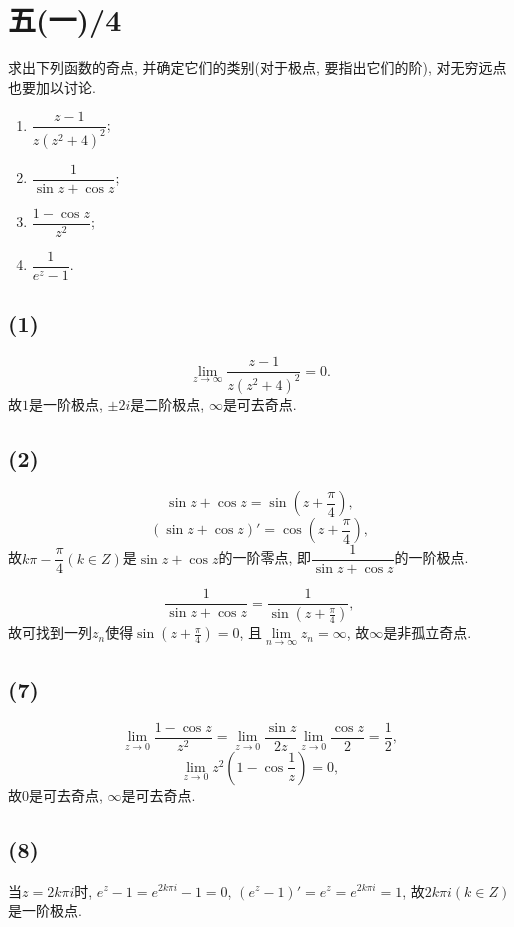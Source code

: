\documentclass[11pt,a4paper]{article}
\author{刘逸灏 (515370910207)}
\begin{document}
\maketitle

\section{五(一)/4}
\begin{problem}
求出下列函数的奇点, 并确定它们的类别(对于极点, 要指出它们的阶), 对无穷远点也要加以讨论.
\begin{enumerate}
  \item $\dfrac{z-1}{z(z^2+4)^2}$;
  \item $\dfrac{1}{\sin z+\cos z}$;
        \addtocounter{enumi}{4}
  \item $\dfrac{1-\cos z}{z^2}$;
  \item $\dfrac{1}{e^z-1}$.
\end{enumerate}
\end{problem}
\subsection*{(1)}
$$\lim_{z\to\infty}\frac{z-1}{z(z^2+4)^2}=0.$$
故$1$是一阶极点, $\pm2i$是二阶极点, $\infty$是可去奇点.

\subsection*{(2)}
$$\sin z+\cos z=\sin\left(z+\frac{\pi}{4}\right),$$
$$(\sin z+\cos z)'=\cos\left(z+\frac{\pi}{4}\right),$$
故$k\pi-\dfrac{\pi}{4}(k\in Z)$是$\sin z+\cos z$的一阶零点, 即$\dfrac{1}{\sin z+\cos z}$的一阶极点.

$$\dfrac{1}{\sin z+\cos z}=\dfrac{1}{\sin\left(z+\frac{\pi}{4}\right)},$$
故可找到一列$z_n$使得$\sin\left(z+\frac{\pi}{4}\right)=0$, 且$\lim\limits_{n\to\infty}z_n=\infty$, 故$\infty$是非孤立奇点.

\subsection*{(7)}
$$\lim_{z\to0}\frac{1-\cos z}{z^2}=\lim_{z\to0}\frac{\sin z}{2z}\lim_{z\to0}\frac{\cos z}{2}=\frac{1}{2},$$
$$\lim_{z\to0}z^2\left(1-\cos\frac{1}{z}\right)=0,$$
故$0$是可去奇点, $\infty$是可去奇点.

\subsection*{(8)}
当$z=2k\pi i$时, $e^z-1=e^{2k\pi i}-1=0$, $(e^z-1)'=e^z=e^{2k\pi i}=1$, 故$2k\pi i(k\in Z)$是一阶极点.
\end{document}

